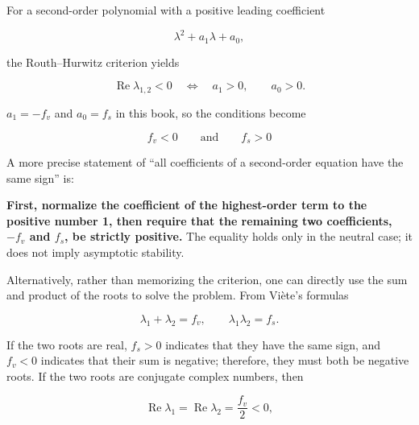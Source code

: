 \documentclass[11pt,a4paper,openany]{book}
\numberwithin{equation}{chapter}
\numberwithin{figure}{chapter}
\numberwithin{table}{chapter}
\begin{document}
For a second-order polynomial with a positive leading coefficient

\begin{equation}
\lambda^2+a_1\lambda+a_0,
\end{equation}

the Routh–Hurwitz criterion yields

\begin{equation}
\operatorname{Re}\lambda_{1,2}<0
\quad\Longleftrightarrow\quad
a_1>0,
\qquad a_0>0.
\end{equation}

$a_1=-f_v$ and $a_0=f_s$ in this book, so the conditions become










\begin{tcolorbox}[keybox,title=\textbf{Local Stability Condition}]
\begin{equation}
f_v < 0
\qquad\text{and}\qquad
f_s > 0
\end{equation}
\end{tcolorbox}










A more precise statement of “all coefficients of a second-order equation have the same sign” is:




\textbf{First, normalize the coefficient of the highest-order term to the positive number 1, then require that the remaining two coefficients, $-f_v$ and $f_s$, be strictly positive.} The equality holds only in the neutral case; it does not imply asymptotic stability.




Alternatively, rather than memorizing the criterion, one can directly use the sum and product of the roots to solve the problem. From Viète’s formulas

\begin{equation}
\lambda_1+\lambda_2=f_v,
\qquad
\lambda_1\lambda_2=f_s.
\end{equation}

If the two roots are real, $f_s>0$ indicates that they have the same sign, and $f_v<0$ indicates that their sum is negative; therefore, they must both be negative roots. If the two roots are conjugate complex numbers, then

\begin{equation}
\operatorname{Re}\lambda_1
=\operatorname{Re}\lambda_2
=\frac{f_v}{2}<0,
\end{equation}
\end{document}
